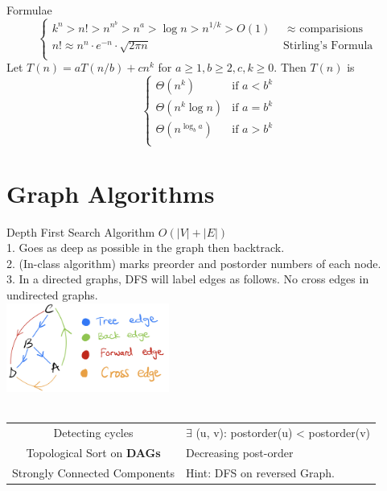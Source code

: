 \documentclass[10pt,a4paper]{article}
\begin{document}
\begin{multicols}{3}
\begin{textbox}{Formulae}
\[\begin{cases}
    k^n > n! > n^{n^b} > n^a > \log n > n^{1/k} > O(1) & \text{ $\approx$ comparisions} \\
    n! \approx n^n \cdot e^{-n} \cdot \sqrt{2\pi n} & \text{ Stirling's Formula }\\
\end{cases}\]
 Let $T(n) = aT(n/b) + cn^k$ for $a \geq 1, b \geq 2, c, k \geq 0$. Then $T(n)$ is 
\[\begin{cases}
    \Theta(n^k) & \text{if $a < b^k$}\\
    \Theta(n^k \log n) & \text{if $a = b^k$}\\
    \Theta(n^{\log_b a}) & \text{if $a > b^k$}\\
\end{cases}\]
\end{textbox}

\section{Graph Algorithms}
\begin{textbox}{Depth First Search Algorithm}
      $O(|V| + |E|)$ \\
    1. Goes as deep as possible in the graph then backtrack.\\
    2. (In-class algorithm) marks preorder and postorder numbers of each node.\\
    3. In a directed graphs, DFS will label edges as follows. No cross edges in undirected graphs.\\
    \includegraphics[width=0.4\textwidth]{images/dfs-edges.jpeg}\\
    \\
    \begin{tabular}{c|p{}}
         Detecting cycles & $\exists$ (u, v): postorder(u) < postorder(v)\\
         Topological Sort on {\bf DAGs} & Decreasing post-order\\
        Strongly Connected Components & Hint: DFS on reversed Graph.\\
   \end{tabular}\\
\end{textbox}


\end{multicols}
\end{document}
